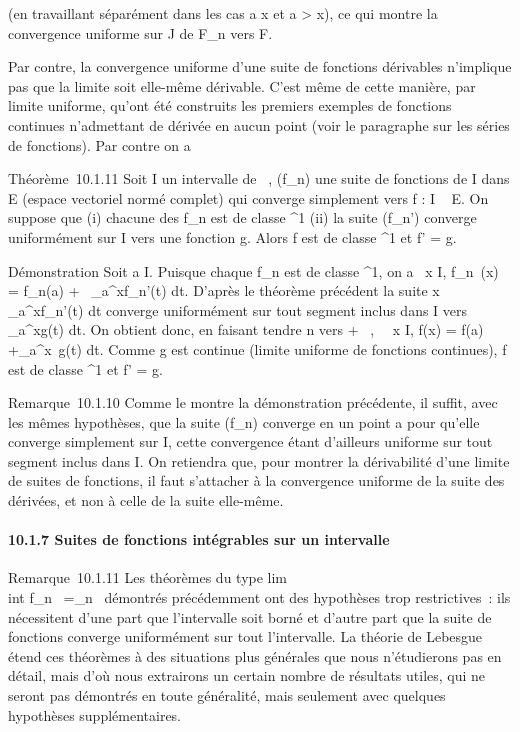 \documentclass[]{article}
\begin{document}
(en travaillant séparément dans les cas a \leq x et a \textgreater{} x), ce
qui montre la convergence uniforme sur J de F\_n vers F.

Par contre, la convergence uniforme d'une suite de fonctions dérivables
n'implique pas que la limite soit elle-même dérivable. C'est même de
cette manière, par limite uniforme, qu'ont été construits les premiers
exemples de fonctions continues n'admettant de dérivée en aucun point
(voir le paragraphe sur les séries de fonctions). Par contre on a

Théorème~10.1.11 Soit I un intervalle de ~, (f\_n) une suite de
fonctions de I dans E (espace vectoriel normé complet) qui converge
simplement vers f : I \rightarrow~ E. On suppose que (i) chacune des f\_n
est de classe ^1 (ii) la suite (f\_n') converge
uniformément sur I vers une fonction g. Alors f est de classe
^1 et f' = g.

Démonstration Soit a \in I. Puisque chaque f\_n est de classe
^1, on a \forall~x \in I, f\_n~(x) =
f\_n(a) +\int ~
\_a^xf\_n'(t) dt. D'après le théorème précédent la
suite x\mapsto~\int ~
\_a^xf\_n'(t) dt converge uniformément sur tout
segment inclus dans I vers \int ~
\_a^xg(t) dt. On obtient donc, en faisant tendre n vers +
\infty~, \forall~~x \in I, f(x) = f(a)
+\int  \_a^x~g(t) dt. Comme g est
continue (limite uniforme de fonctions continues), f est de classe
^1 et f' = g.

Remarque~10.1.10 Comme le montre la démonstration précédente, il suffit,
avec les mêmes hypothèses, que la suite (f\_n) converge en un
point a pour qu'elle converge simplement sur I, cette convergence étant
d'ailleurs uniforme sur tout segment inclus dans I. On retiendra que,
pour montrer la dérivabilité d'une limite de suites de fonctions, il
faut s'attacher à la convergence uniforme de la suite des dérivées, et
non à celle de la suite elle-même.

\paragraph{10.1.7 Suites de fonctions intégrables sur un intervalle}

Remarque~10.1.11 Les théorèmes du type
lim\\int  f\_n~
=\int  \limf\_n~
démontrés précédemment ont des hypothèses trop restrictives~: ils
nécessitent d'une part que l'intervalle soit borné et d'autre part que
la suite de fonctions converge uniformément sur tout l'intervalle. La
théorie de Lebesgue étend ces théorèmes à des situations plus générales
que nous n'étudierons pas en détail, mais d'où nous extrairons un
certain nombre de résultats utiles, qui ne seront pas démontrés en toute
généralité, mais seulement avec quelques hypothèses supplémentaires.
\end{document}
